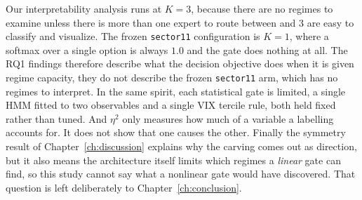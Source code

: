 Our interpretability analysis runs at $K=3$, because there are no regimes to examine unless there is more than one expert to route between and 3 are easy to classify and visualize. The frozen \texttt{sector11} configuration is $K=1$, where a softmax over a single option is always $1.0$ and the gate does nothing at all. The RQ1 findings therefore describe what the decision objective does when it is given regime capacity, they do not describe the frozen \texttt{sector11} arm, which has no regimes to interpret. In the same spirit, each statistical gate is limited, a single HMM fitted to two observables and a single VIX tercile rule, both held fixed rather than tuned. And $\eta^2$ only measures how much of a variable a labelling accounts for. It does not show that one causes the other. Finally the symmetry result of Chapter~\ref{ch:discussion} explains why the carving comes out as direction, but it also means the architecture itself limits which regimes a \emph{linear} gate can find, so this study cannot say what a nonlinear gate would have discovered. That question is left deliberately to Chapter~\ref{ch:conclusion}.

